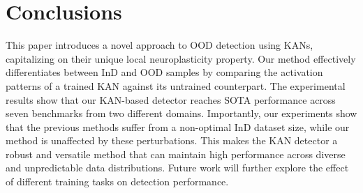 \section{Conclusions}

This paper introduces a novel approach to OOD detection using KANs, capitalizing on their unique local neuroplasticity property. 
Our method effectively differentiates between InD and OOD samples by comparing the activation patterns of a trained KAN against its untrained counterpart. 
The experimental results show that our KAN-based detector reaches SOTA performance across seven benchmarks from two different domains. 
Importantly, our experiments show that the previous methods suffer from a non-optimal InD dataset size, while our method is unaffected by these perturbations.
This makes the KAN detector a robust and versatile method that can maintain high performance across diverse and unpredictable data distributions. 
Future work will further explore the effect of different training tasks on detection performance.